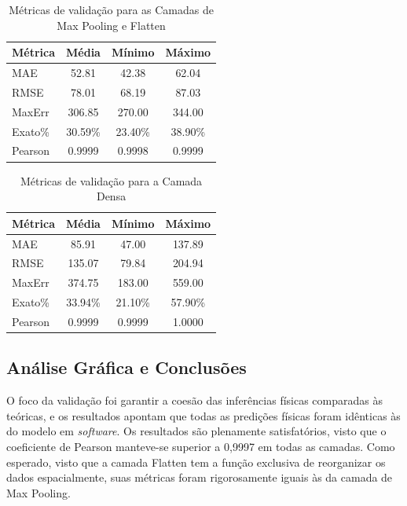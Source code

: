 \begin{table}[htbp]
\centering
\caption{Métricas de validação para as Camadas de Max Pooling e Flatten}
\label{tab:metricas_pool_flatten}
\begin{tabular}{lccc}
\toprule
\textbf{Métrica} & \textbf{Média} & \textbf{Mínimo} & \textbf{Máximo} \\
\midrule
MAE     & 52.81   & 42.38   & 62.04   \\
RMSE    & 78.01   & 68.19   & 87.03   \\
MaxErr  & 306.85  & 270.00  & 344.00  \\
Exato\% & 30.59\% & 23.40\% & 38.90\% \\
Pearson & 0.9999  & 0.9998  & 0.9999  \\
\bottomrule
\end{tabular}
\end{table}

\begin{table}[htbp]
\centering
\caption{Métricas de validação para a Camada Densa}
\label{tab:metricas_densa}
\begin{tabular}{lccc}
\toprule
\textbf{Métrica} & \textbf{Média} & \textbf{Mínimo} & \textbf{Máximo} \\
\midrule
MAE     & 85.91   & 47.00   & 137.89  \\
RMSE    & 135.07  & 79.84   & 204.94  \\
MaxErr  & 374.75  & 183.00  & 559.00  \\
Exato\% & 33.94\% & 21.10\% & 57.90\% \\
Pearson & 0.9999  & 0.9999  & 1.0000  \\
\bottomrule
\end{tabular}
\end{table}

\subsection{Análise Gráfica e Conclusões}

O foco da validação foi garantir a coesão das inferências físicas comparadas às teóricas, e os resultados apontam que todas as predições físicas foram idênticas às do modelo em \textit{software}. Os resultados são plenamente satisfatórios, visto que o coeficiente de Pearson manteve-se superior a 0,9997 em todas as camadas. Como esperado, visto que a camada Flatten tem a função exclusiva de reorganizar os dados espacialmente, suas métricas foram rigorosamente iguais às da camada de Max Pooling.

